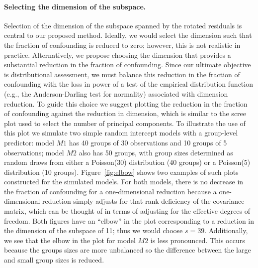 \documentclass[12pt]{article} %
\begin{document}
{\paragraph{Selecting the dimension of the subspace.}
Selection of the dimension of the subspace spanned by the rotated residuals is central to our proposed method. Ideally, we would select the dimension such that the fraction of confounding is reduced to zero; however, this is not realistic in practice. Alternatively, we propose choosing the dimension that provides a substantial reduction in the fraction of confounding. Since our ultimate objective is distributional assessment, we must balance this reduction in the fraction of confounding with the loss in power of a test of the empirical distribution function (e.g., the Anderson-Darling test for normality) associated with dimension reduction. To guide this choice we suggest plotting the reduction in the fraction of confounding against the reduction in dimension, which is similar to the scree plot used to select the number of principal components. To illustrate the use of this plot we simulate two simple random intercept models with a group-level predictor:   model $M1$ has 40 groups of 30 observations and 10 groups of 5 observations;   model $M2$ also has 50 groups, with group sizes determined as random draws from either a Poisson(30) distribution (40 groups) or a Poisson(5) distribution (10 groups). %
 Figure~\ref{fig:elbow} shows two examples of such plots constructed for the simulated models. For both models, there is no decrease in the fraction of confounding for a one-dimensional reduction because a {one-dimensional reduction} simply adjusts for that rank deficiency of the covariance matrix, which can be thought of in terms of adjusting for the effective degrees of freedom. Both figures have an ``elbow'' in the plot corresponding to a reduction in the dimension of the subspace of 11; thus we would choose $s = 39$. { Additionally, we see that the elbow in the plot for model $M2$ is less pronounced. This occurs because the groups sizes are more unbalanced so the difference between the large and small group sizes is reduced.}
 
}
\end{document}

